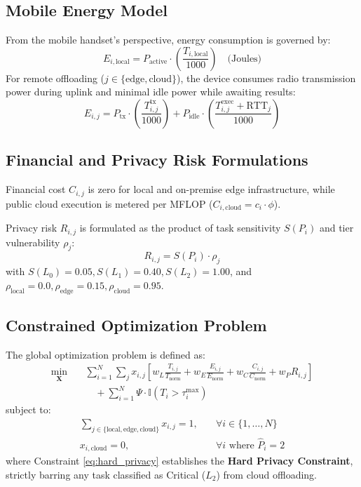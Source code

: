 \documentclass[conference]{IEEEtran}
\begin{document}
\subsection{Mobile Energy Model}
From the mobile handset's perspective, energy consumption is governed by:
\begin{equation}
    E_{i, \text{local}} = P_{\text{active}} \cdot \left(\frac{T_{i, \text{local}}}{1000}\right) \quad \text{(Joules)}
\end{equation}
For remote offloading ($j \in \{\text{edge}, \text{cloud}\}$), the device consumes radio transmission power during uplink and minimal idle power while awaiting results:
\begin{equation}
    E_{i, j} = P_{\text{tx}} \cdot \left(\frac{T_{i, j}^{\text{tx}}}{1000}\right) + P_{\text{idle}} \cdot \left(\frac{T_{i, j}^{\text{exec}} + \text{RTT}_j}{1000}\right)
\end{equation}

\subsection{Financial and Privacy Risk Formulations}
Financial cost $C_{i, j}$ is zero for local and on-premise edge infrastructure, while public cloud execution is metered per MFLOP ($C_{i, \text{cloud}} = c_i \cdot \phi$).

Privacy risk $R_{i, j}$ is formulated as the product of task sensitivity $S(P_i)$ and tier vulnerability $\rho_j$:
\begin{equation}
    R_{i, j} = S(P_i) \cdot \rho_j
\end{equation}
with $S(L_0)=0.05, S(L_1)=0.40, S(L_2)=1.00$, and $\rho_{\text{local}}=0.0, \rho_{\text{edge}}=0.15, \rho_{\text{cloud}}=0.95$.

\subsection{Constrained Optimization Problem}
The global optimization problem is defined as:
\begin{align}
    \min_{\mathbf{X}} \quad & \sum_{i=1}^N \sum_{j} x_{i, j} \left[ w_L \frac{T_{i, j}}{T_{\text{norm}}} + w_E \frac{E_{i, j}}{E_{\text{norm}}} + w_C \frac{C_{i, j}}{C_{\text{norm}}} + w_P R_{i, j} \right] \nonumber \\
    & \quad + \sum_{i=1}^N \Psi \cdot \mathbb{I}(T_i > \tau_i^{\max}) \label{eq:objective}
\end{align}
subject to:
\begin{align}
    \sum_{j \in \{\text{local}, \text{edge}, \text{cloud}\}} x_{i, j} = 1, & \quad \forall i \in \{1, \dots, N\} \label{eq:assign} \\
    x_{i, \text{cloud}} = 0, & \quad \forall i \text{ where } \hat{P}_i = 2 \label{eq:hard_privacy}
\end{align}
where Constraint \eqref{eq:hard_privacy} establishes the \textbf{Hard Privacy Constraint}, strictly barring any task classified as Critical ($L_2$) from cloud offloading.
\end{document}
